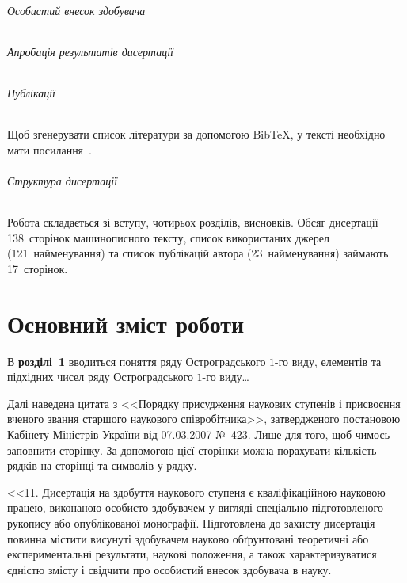 \documentclass{vakaref}
\theoremstyle{plain}
\theoremstyle{definition}
\theoremstyle{remark}
\begin{document}
\paragraph{Особистий внесок здобувача}

\paragraph{Апробація результатів дисертації}

\paragraph{Публікації}

Щоб згенерувати список літератури за допомогою Bib\TeX, у тексті
необхідно мати посилання~\cite{Bar98fasp1,Bar98fasp2,PrB01umc}.

\paragraph{Структура дисертації}

Робота складається зі вступу, чотирьох розділів, висновків. Обсяг
дисертації 138~сторінок машинописного тексту, список використаних
джерел (121~найменування) та список публікацій автора
(23~найменування) займають 17~сторінок.


\part{Основний зміст роботи}

В \textbf{розділі~1} вводиться поняття ряду Остроградського $1$-го
виду, елементів та підхідних чисел ряду Остроградського $1$-го
виду\ldots

Далі наведена цитата з <<Порядку присудження наукових ступенів і
присвоєння вченого звання старшого наукового співробітника>>,
затвердженого постановою Кабінету Міністрів України від 07.03.2007
№~423. Лише для того, щоб чимось заповнити сторінку. За допомогою
цієї сторінки можна порахувати кількість рядків на сторінці та
символів у рядку.

<<11. Дисертація на здобуття наукового ступеня є кваліфікаційною
науковою працею, виконаною особисто здобувачем у вигляді
спеціально підготовленого рукопису або опублікованої монографії.
Підготовлена до захисту дисертація повинна містити висунуті
здобувачем науково обґрунтовані теоретичні або експериментальні
результати, наукові положення, а також характеризуватися єдністю
змісту і свідчити про особистий внесок здобувача в науку.
\end{document}
